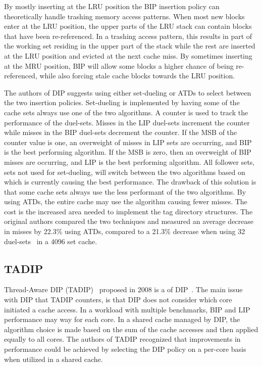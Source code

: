 By mostly inserting at the LRU position the BIP insertion policy can theoretically handle trashing memory access patterns.
When most new blocks enter at the LRU position, the upper parts of the LRU stack can contain blocks that have been re-referenced.
In a trashing access pattern, this results in part of the working set residing in the upper part of the stack while the rest are inserted at the LRU position and evicted at the next cache miss.
By sometimes inserting at the MRU position, BIP will allow some blocks a higher chance of being re-referenced, while also forcing stale cache blocks towards the LRU position. 

The authors of DIP suggests using either set-dueling or ATDs to select between the two insertion policies.
Set-dueling is implemented by having some of the cache sets always use one of the two algorithms.
A counter is used to track the performance of the duel-sets.
Misses in the LIP duel-sets increment the counter while misses in the BIP duel-sets decrement the counter.
If the MSB of the counter value is one, an overweight of misses in LIP sets are occurring, and BIP is the best performing algorithm. 
If the MSB is zero, then an overweight of BIP misses are occurring, and LIP is the best performing algorithm.
All follower sets, sets not used for set-dueling, will switch between the two algorithms based on which is currently causing the best performance.
The drawback of this solution is that some cache sets always use the less performant of the two algorithms.
By using ATDs, the entire cache may use the algorithm causing fewer misses.
The cost is the increased area needed to implement the tag directory structures.
The original authors compared the two techniques and measured an average decrease in misses by 22.3\% using ATDs, compared to a 21.3\% decrease when using 32 duel-sets~\cite{Qureshi2007} in a 4096 set cache.

\subsection{TADIP}
Thread-Aware DIP (TADIP)~\cite{Jaleel2008} proposed in 2008 is a of DIP~\cite{Qureshi2007}.
The main issue with DIP that TADIP counters, is that DIP does not consider which core initiated a cache access.
In a workload with multiple benchmarks, BIP and LIP performance may way for each core.
In a shared cache managed by DIP, the algorithm choice is made based on the sum of the cache accesses and then applied equally to all cores.
The authors of TADIP recognized that improvements in performance could be achieved by selecting the DIP policy on a per-core basis when utilized in a shared cache.

